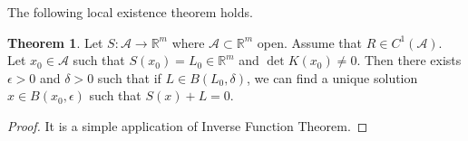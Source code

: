 \documentclass[a4paper,11pt]{article}
\theoremstyle{definition}
\newtheorem{theorem}[proposition]{Theorem}
\begin{document}
The following local existence theorem holds.
\begin{theorem}
Let $S\colon\mathscr{A}\to\mathbb{R}^m$ where $\mathscr{A}\subset\mathbb{R}^m$ open. Assume that $R\in C^1(\mathscr{A})$. Let $x_0\in\mathscr{A}$ such that $S(x_0)=L_0\in\mathbb{R}^m$ and $\det K(x_0)\neq0$. Then there exists $\epsilon>0$ and $\delta>0$ such that if $L\in B(L_0,\delta)$, we can find a unique solution $x\in B(x_0,\epsilon)$ such that $S(x)+L=0$. 
\end{theorem}
\begin{proof}
It is a simple application of Inverse Function Theorem.
\end{proof}

\nocite{bonet-wood}
\nocite{nm}
\nocite{gurtin-anand-fried}
\nocite{silhavy}

\printbibliography
\end{document}
